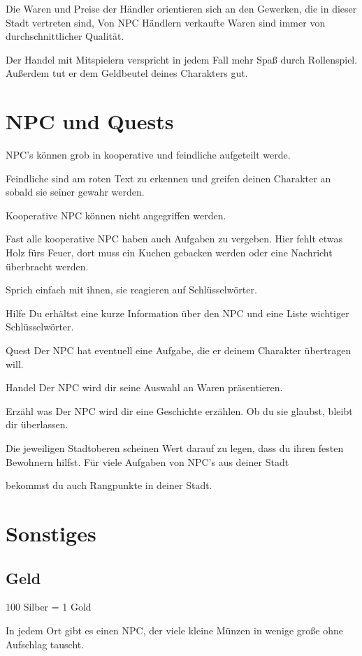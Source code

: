 \documentclass[a4paper,11pt]{book}
\begin{document}
Die Waren und Preise der Händler orientieren sich an den Gewerken, die in dieser Stadt vertreten sind, Von NPC Händlern verkaufte Waren sind immer von durchschnittlicher Qualität.

Der Handel mit Mitspielern verspricht in jedem Fall mehr Spaß durch Rollenspiel. Außerdem tut er dem Geldbeutel deines Charakters gut.

\section{NPC und Quests}

NPC’s können grob in kooperative und feindliche aufgeteilt werde.

Feindliche sind am roten Text zu erkennen und greifen deinen Charakter an sobald sie seiner gewahr werden.

Kooperative NPC können nicht angegriffen werden.

Fast alle kooperative NPC haben auch Aufgaben zu vergeben. Hier fehlt etwas Holz fürs Feuer, dort muss ein Kuchen gebacken werden oder eine Nachricht überbracht werden.

Sprich einfach mit ihnen, sie reagieren auf Schlüsselwörter.

Hilfe  Du erhältst eine kurze Information über den NPC und eine Liste wichtiger Schlüsselwörter.

Quest  Der NPC hat eventuell eine Aufgabe, die er deinem Charakter übertragen will.

Handel  Der NPC wird dir seine Auswahl an Waren präsentieren.

Erzähl was Der NPC wird dir eine Geschichte erzählen. Ob du sie glaubst, bleibt dir überlassen.

Die jeweiligen Stadtoberen scheinen Wert darauf zu legen, dass du ihren festen Bewohnern hilfst. Für viele Aufgaben von NPC’s aus deiner Stadt

bekommst du auch Rangpunkte in deiner Stadt.

\section{Sonstiges}

\subsection{Geld}
100 Silber = 1 Gold

In jedem Ort gibt es einen NPC, der viele kleine Münzen in wenige große ohne Aufschlag tauscht.
\end{document}
